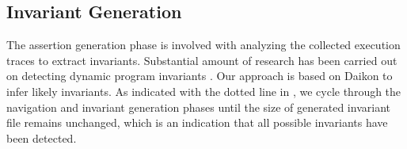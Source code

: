 

\subsection{Invariant Generation}
The assertion generation phase is involved with analyzing the collected execution traces to extract invariants.   Substantial amount of research has been carried out on detecting dynamic program invariants \cite{agitator:issta06,Csallner08dysy,ernst2007daikon,Hangal02trackingdown}. Our approach is based on Daikon \cite{ernst2007daikon} to infer likely invariants. %
% 
As indicated with the dotted line in , we cycle through the navigation and invariant generation phases until the size of generated invariant file remains unchanged, which is an indication that all possible invariants have been detected.

